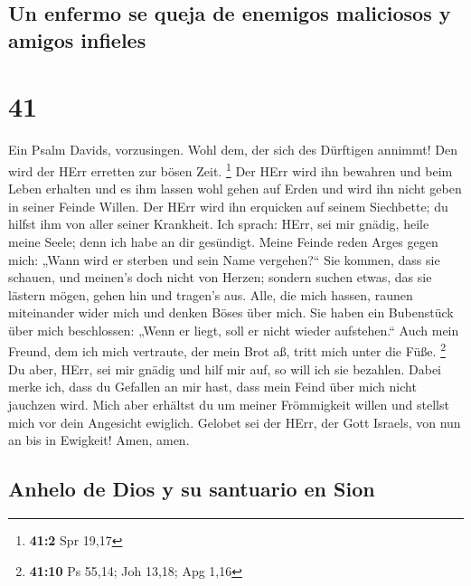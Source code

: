 \hypertarget{un-enfermo-se-queja-de-enemigos-maliciosos-y-amigos-infieles}{%
\subsection{Un enfermo se queja de enemigos maliciosos y amigos
infieles}\label{un-enfermo-se-queja-de-enemigos-maliciosos-y-amigos-infieles}}

\hypertarget{section-40}{%
\section{41}\label{section-40}}

 Ein Psalm Davids, vorzusingen.  Wohl dem,
der sich des Dürftigen annimmt! Den wird der HErr erretten zur bösen
Zeit. \footnote{\textbf{41:2} Spr 19,17}  Der HErr wird
ihn bewahren und beim Leben erhalten und es ihm lassen wohl gehen auf
Erden und wird ihn nicht geben in seiner Feinde Willen. 
Der HErr wird ihn erquicken auf seinem Siechbette; du hilfst ihm von
aller seiner Krankheit.  Ich sprach: HErr, sei mir gnädig,
heile meine Seele; denn ich habe an dir gesündigt.  Meine
Feinde reden Arges gegen mich: „Wann wird er sterben und sein Name
vergehen?{}``  Sie kommen, dass sie schauen, und meinen's
doch nicht von Herzen; sondern suchen etwas, das sie lästern mögen,
gehen hin und tragen's aus.  Alle, die mich hassen, raunen
miteinander wider mich und denken Böses über mich.  Sie
haben ein Bubenstück über mich beschlossen: „Wenn er liegt, soll er
nicht wieder aufstehen.``  Auch mein Freund, dem ich mich
vertraute, der mein Brot aß, tritt mich unter die Füße. \footnote{\textbf{41:10}
  Ps 55,14; Joh 13,18; Apg 1,16}  Du aber, HErr, sei mir
gnädig und hilf mir auf, so will ich sie bezahlen.  Dabei
merke ich, dass du Gefallen an mir hast, dass mein Feind über mich nicht
jauchzen wird.  Mich aber erhältst du um meiner
Frömmigkeit willen und stellst mich vor dein Angesicht ewiglich.
 Gelobet sei der HErr, der Gott Israels, von nun an bis
in Ewigkeit! Amen, amen.

\hypertarget{anhelo-de-dios-y-su-santuario-en-sion}{%
\subsection{Anhelo de Dios y su santuario en
Sion}\label{anhelo-de-dios-y-su-santuario-en-sion}}

